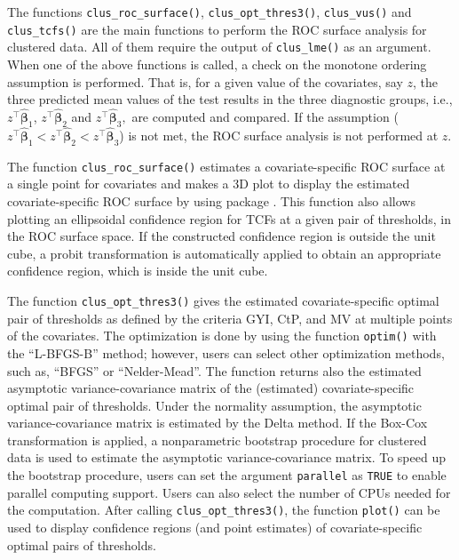 The functions {\texttt{clus\_roc\_surface()}}, {\texttt{clus\_opt\_thres3()}}, {\texttt{clus\_vus()}} and {\texttt{clus\_tcfs()}} are the main functions to perform the ROC surface analysis for clustered data. All of them require the output of {\texttt{clus\_lme()}} as an argument. When one of the above functions is called, a check on the monotone ordering assumption is performed. That is, for a given value of the covariates, say $z$, the three predicted mean values of the test results in the three diagnostic groups, i.e., $z^\top \widehat{\boldsymbol{\beta}}_1$, $z^\top \widehat{\boldsymbol{\beta}}_2$ and $z^\top \widehat{\boldsymbol{\beta}}_3,$ are computed and compared. If the assumption ($z^\top \widehat{\boldsymbol{\beta}}_1 < z^\top \widehat{\boldsymbol{\beta}}_2 < z^\top \widehat{\boldsymbol{\beta}}_3$) is not met, the ROC surface analysis is not performed at $z$.

The function {\texttt{clus\_roc\_surface()}} estimates a covariate-specific ROC surface at a single point for covariates and makes a 3D plot to display the estimated covariate-specific ROC surface by using  package \citep{rgl}. This function also allows plotting an ellipsoidal confidence region for TCFs at a given pair of thresholds, in the ROC surface space. If the constructed confidence region is outside the unit cube, a probit transformation \citep{bantis2017construction} is automatically applied to obtain an appropriate confidence region, which is inside the unit cube.

The function {\texttt{clus\_opt\_thres3()}} gives the estimated covariate-specific optimal pair of thresholds as defined by the criteria GYI, CtP, and MV at multiple points of the covariates. The optimization is done by using the function \texttt{optim()} with the ``L-BFGS-B'' method; however, users can select other optimization methods, such as, ``BFGS'' or ``Nelder-Mead''. The function returns also the estimated asymptotic variance-covariance matrix of the (estimated) covariate-specific optimal pair of thresholds. Under the {normality assumption}, the asymptotic variance-covariance matrix is estimated by the Delta method. If the Box-Cox transformation is applied, a nonparametric bootstrap procedure for clustered data is used to estimate the asymptotic variance-covariance matrix. To speed up the bootstrap procedure, users can set the argument \texttt{parallel} as \texttt{TRUE} to enable parallel computing support. Users can also select the number of CPUs needed for the computation. After calling {\texttt{clus\_opt\_thres3()}}, the function \texttt{plot()} can be used to display confidence regions (and point estimates) of covariate-specific optimal pairs of thresholds.

